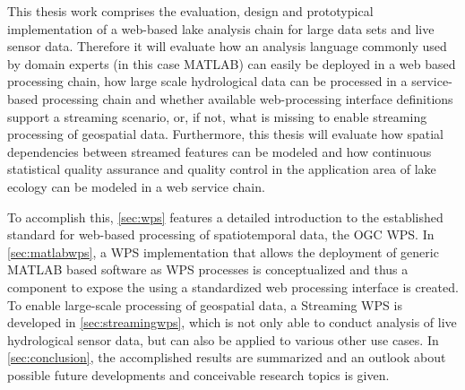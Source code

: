 This thesis work comprises the evaluation, design and prototypical implementation of a web-based lake analysis chain for large data sets and live sensor data. Therefore it will evaluate how an analysis language commonly used by domain experts (in this case MATLAB) can easily be deployed in a web based processing chain, how large scale hydrological data can be processed in a service-based processing chain and whether available web-processing interface definitions support a streaming scenario, or, if not, what is missing to enable streaming processing of geospatial data. Furthermore, this thesis will evaluate how spatial dependencies between streamed features can be modeled and how continuous statistical quality assurance and quality control in the application area of lake ecology can be modeled in a web service chain.

To accomplish this, \cref{sec:wps} features a detailed introduction to the established standard for web-based processing of spatiotemporal data, the OGC \acl{WPS}. In \cref{sec:matlabwps}, a WPS implementation that allows the deployment of generic MATLAB based software as WPS processes is conceptualized and thus a component to expose the \la using a standardized web processing interface is created. To enable large-scale processing of geospatial data, a Streaming WPS is developed in \cref{sec:streamingwps}, which is not only able to conduct analysis of live hydrological sensor data, but can also be applied to various other use cases. In \cref{sec:conclusion}, the accomplished results are summarized and an outlook about possible future developments and conceivable research topics is given.
